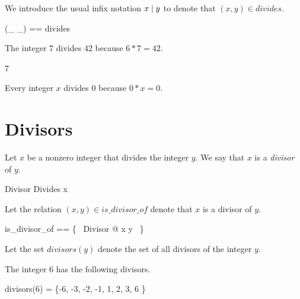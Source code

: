 \documentclass{amsart}
\begin{document}
We introduce the usual infix notation $x \mathrel{\mid} y$ to denote that $(x, y) \in divides$.
\begin{zed}
(\_ \divides \_) == divides
\end{zed}

\begin{example}
The integer $7$ divides $42$ because $6 * 7 = 42$.

\begin{zed}
	7 
\end{zed}
\end{example}

\begin{remark}
Every integer $x$ divides $0$ because $0 * x = 0$.

\end{remark}

\section{Divisors}

Let $x$ be a nonzero integer that divides the integer $y$.
We say that $x$ is a \textit{divisor} of $y$.

\begin{schema}{Divisor}
	Divides
\where
	x 
\end{schema}

Let the relation $(x, y) \in is\_divisor\_of$ denote that $x$ is a divisor of $y$.

\begin{zed}
	is\_divisor\_of == \{~ Divisor @ x \mapsto y ~\}
\end{zed}

Let the set $divisors(y)$ denote the set of all divisors of the integer $y$.


\begin{remark}
\end{remark}

\begin{example}
The integer $6$ has the following divisors.

\begin{zed}
	divisors(6) = \{-6, -3, -2, -1, 1, 2, 3, 6 \}
\end{zed}
\end{example}
\end{document}
